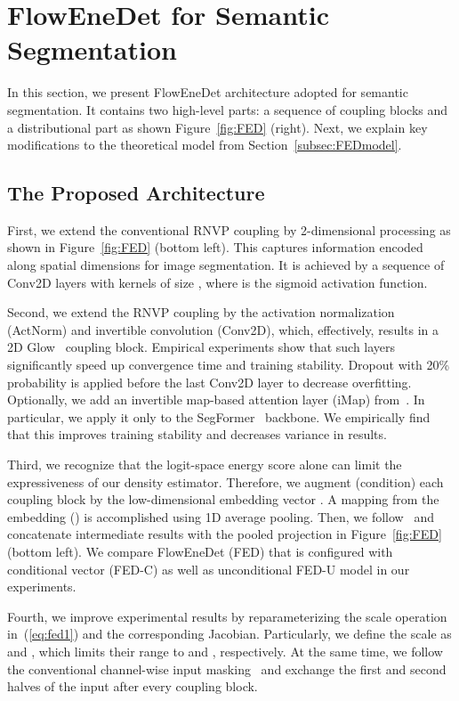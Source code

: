 \documentclass[accepted, startpage]{uai2023}
\begin{document}
\section{FlowEneDet for Semantic Segmentation}\label{sec:FED}
In this section, we present FlowEneDet architecture adopted for semantic segmentation. It contains two high-level parts: a sequence of  coupling blocks  and a distributional part  as shown Figure~\ref{fig:FED} (right). Next, we explain key modifications to the theoretical model from Section~\ref{subsec:FEDmodel}.

\subsection{The Proposed Architecture}\label{subsec:arch}
First, we extend the conventional RNVP coupling by 2-dimensional processing as shown in Figure~\ref{fig:FED} (bottom left). This captures information encoded along spatial dimensions for image segmentation. It is achieved by a sequence of Conv2D layers with kernels of size          , where  is the sigmoid activation function.

Second, we extend the RNVP coupling by the activation normalization (ActNorm) and invertible  convolution (Conv2D), which, effectively, results in a 2D Glow~\citep{NEURIPS2018_d139db6a} coupling block. Empirical experiments show that such layers significantly speed up convergence time and training stability. Dropout with 20\% probability is applied before the last  Conv2D layer to decrease overfitting. Optionally, we add an invertible map-based attention layer (iMap) from~\citep{Sukthanker_2022_CVPR}. In particular, we apply it only to the SegFormer~\citep{xie2021segformer} backbone. We empirically find that this improves training stability and decreases variance in results.

Third, we recognize that the logit-space energy score alone can limit the expressiveness of our density estimator. Therefore, we augment (condition) each coupling block by the low-dimensional embedding vector . A mapping from the embedding  () is accomplished using 1D average pooling. Then, we follow~\citep{ardizzone2019guided} and concatenate  intermediate results with the pooled projection  in Figure~\ref{fig:FED} (bottom left). We compare FlowEneDet (FED) that is configured with conditional vector  (FED-C) as well as unconditional FED-U model in our experiments.

Fourth, we improve experimental results by reparameterizing the scale operation  in~(\ref{eq:fed1}) and the corresponding Jacobian. Particularly, we define the scale as  and , which limits their range to  and , respectively. At the same time, we follow the conventional channel-wise input masking~\citep{45819} and exchange the first and second halves of the input  after every coupling block.
\end{document}

